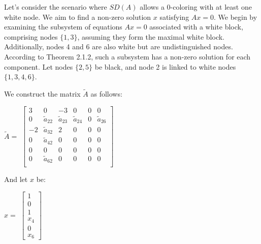 \begin{example}
	Let's consider the scenario where $SD(A)$ allows a 0-coloring with at least one white node. We aim to find a non-zero solution $x$ satisfying $Ax = 0$. We begin by examining the subsystem of equations $Ax = 0$ associated with a white block, comprising nodes $\{1,3\}$, assuming they form the maximal white block. Additionally, nodes 4 and 6 are also white but are undistinguished nodes. According to Theorem 2.1.2, such a subsystem has a non-zero solution for each component. Let nodes $\{2,5\}$ be black, and node 2 is linked to white nodes $\{1,3,4,6\}$.
	
	We construct the matrix $\tilde{A}$ as follows:
	\begin{center}
		$\tilde{A}=$
		$\begin{bmatrix}
			3 & 0 & -3 & 0 & 0 & 0\\
			0 & \tilde{a}_{22} & \tilde{a}_{23} & \tilde{a}_{24} & 0 & \tilde{a}_{26}\\
			-2 & \tilde{a}_{32} & 2 & 0 & 0 & 0\\
			0 & \tilde{a}_{42} & 0 & 0 & 0 & 0\\
			0 & 0 & 0 & 0 & 0 & 0\\
			0 & \tilde{a}_{62} & 0 & 0 & 0 & 0\\
		\end{bmatrix}$
	\end{center}
	And let $x$ be:
	\begin{center}
		$x=$
		$\begin{bmatrix}
			1 \\
			0 \\
			1 \\
			x_4 \\
			0 \\
			x_6
		\end{bmatrix}$
	\end{center}
	

\end{example}
